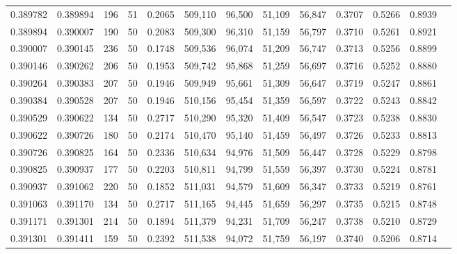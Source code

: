 \begin{tabular}{rrrrrrrrrrrrr}
0.389782 & 0.389894 &   196 &  51 &                                     0.2065 & 509,110 &  96,500 &  51,109 &  56,847 & 0.3707 & 0.5266 & 0.8939 \\
0.389894 & 0.390007 &   190 &  50 &                                     0.2083 & 509,300 &  96,310 &  51,159 &  56,797 & 0.3710 & 0.5261 & 0.8921 \\
0.390007 & 0.390145 &   236 &  50 &                                     0.1748 & 509,536 &  96,074 &  51,209 &  56,747 & 0.3713 & 0.5256 & 0.8899 \\
0.390146 & 0.390262 &   206 &  50 &                                     0.1953 & 509,742 &  95,868 &  51,259 &  56,697 & 0.3716 & 0.5252 & 0.8880 \\
0.390264 & 0.390383 &   207 &  50 &                                     0.1946 & 509,949 &  95,661 &  51,309 &  56,647 & 0.3719 & 0.5247 & 0.8861 \\
0.390384 & 0.390528 &   207 &  50 &                                     0.1946 & 510,156 &  95,454 &  51,359 &  56,597 & 0.3722 & 0.5243 & 0.8842 \\
0.390529 & 0.390622 &   134 &  50 &                                     0.2717 & 510,290 &  95,320 &  51,409 &  56,547 & 0.3723 & 0.5238 & 0.8830 \\
0.390622 & 0.390726 &   180 &  50 &                                     0.2174 & 510,470 &  95,140 &  51,459 &  56,497 & 0.3726 & 0.5233 & 0.8813 \\
0.390726 & 0.390825 &   164 &  50 &                                     0.2336 & 510,634 &  94,976 &  51,509 &  56,447 & 0.3728 & 0.5229 & 0.8798 \\
0.390825 & 0.390937 &   177 &  50 &                                     0.2203 & 510,811 &  94,799 &  51,559 &  56,397 & 0.3730 & 0.5224 & 0.8781 \\
0.390937 & 0.391062 &   220 &  50 &                                     0.1852 & 511,031 &  94,579 &  51,609 &  56,347 & 0.3733 & 0.5219 & 0.8761 \\
0.391063 & 0.391170 &   134 &  50 &                                     0.2717 & 511,165 &  94,445 &  51,659 &  56,297 & 0.3735 & 0.5215 & 0.8748 \\
0.391171 & 0.391301 &   214 &  50 &                                     0.1894 & 511,379 &  94,231 &  51,709 &  56,247 & 0.3738 & 0.5210 & 0.8729 \\
0.391301 & 0.391411 &   159 &  50 &                                     0.2392 & 511,538 &  94,072 &  51,759 &  56,197 & 0.3740 & 0.5206 & 0.8714 \\

\end{tabular}
